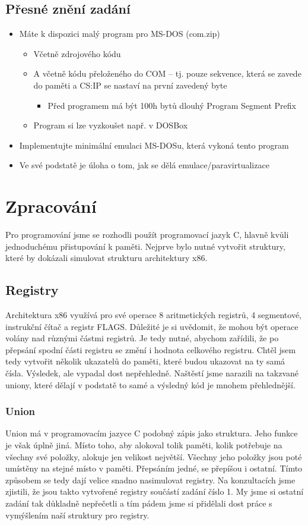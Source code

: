 \documentclass[a4paper, 12pt]{article}
\begin{document}
\subsection{Přesné znění zadání}
\begin{itemize}
\item Máte k dispozici malý program pro MS-DOS (com.zip)
\begin{itemize}
\item Včetně zdrojového kódu
\item A včetně kódu přeloženého do COM – tj. pouze sekvence, která se zavede do paměti a CS:IP se nastaví na první zavedený byte
\begin{itemize}
\item Před programem má být 100h bytů dlouhý Program Segment Prefix
\end{itemize}
\item Program si lze vyzkoušet např. v DOSBox
\end{itemize}
\item Implementujte minimální emulaci MS-DOSu, která vykoná tento program
\item Ve své podstatě je úloha o tom, jak se dělá emulace/paravirtualizace
\end{itemize}
\section{Zpracování}
Pro programování jsme se rozhodli použít programovací jazyk C, hlavně kvůli jednoduchému přistupování k paměti. Nejprve bylo nutné vytvořit struktury, které by dokázali simulovat strukturu architektury x86. 
\subsection{Registry}
Architektura x86 využívá pro své operace 8 aritmetických registrů, 4 segmentové, instrukční čítač a registr FLAGS. Důležité je si uvědomit, že mohou být operace volány nad různými částmi registrů. Je tedy nutné, abychom zařídili, že po přepsání spodní části registru se změní i hodnota celkového registru. Chtěl jsem tedy vytvořit několik ukazatelů do paměti, které budou ukazovat na ty samá čísla. Výsledek, ale vypadal dost nepřehledně. Naštěstí jsme narazili na takzvané uniony, které dělají v podstatě to samé a výsledný kód je mnohem přehlednější.
\subsubsection{Union}
Union má v programovacím jazyce C podobný zápis jako struktura. Jeho funkce je však úplně jiná. Místo toho, aby alokoval tolik paměti, kolik potřebuje na všechny své položky, alokuje jen velikost největší. Všechny jeho položky jsou poté umístěny na stejné místo v paměti. Přepsáním jedné, se přepíšou i ostatní. Tímto způsobem se tedy dají velice snadno nasimulovat registry. Na konzultacích jsme zjistili, že jsou takto vytvořené registry součástí zadání číslo 1. My jsme si ostatní zadání tak důkladně nepřečetli a tím pádem jsme si přidělali dost práce s vymýšlením naší struktury pro registry. 
\end{document}

